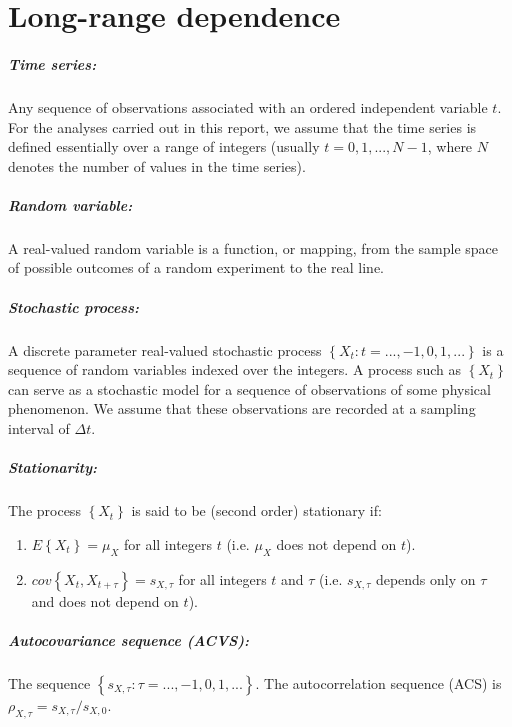 \documentclass[methods.tex]{subfiles}
\begin{document}
\chapter{Long-range dependence}

\paragraph{Time series:} Any sequence of observations associated with an ordered independent variable $t$. For the analyses carried out in this report, we assume that the time series is defined essentially over a range of integers (usually $t = 0 , 1 , ... , N - 1$, where $N$ denotes the number of values in the time series).

\paragraph{Random variable:} A real-valued random variable is a function, or mapping, from the sample space of possible outcomes of a random experiment to the real line.

\paragraph{Stochastic process:} A discrete parameter real-valued stochastic process $\left\{ X_t : t = ... , -1 , 0 , 1 , ... \right\}$ is a sequence of random variables indexed over the integers. A process such as $\left\{ X_t \right\}$ can serve as a stochastic model for a sequence of observations of some physical phenomenon. We assume that these observations are recorded at a sampling interval of $\Delta t$.

\paragraph{Stationarity:} The process $\left\{ X_t \right\} $ is said to be (second order) stationary if:
\begin{enumerate}
\item $E \left\{ X_t \right\} = \mu_X$ for all integers $t$ (i.e. $\mu_X$ does not depend on $t$).
\item $cov \left\{ X_t , X_{t + \tau} \right\} = s_{X , \tau}$ for all integers $t$ and $\tau$ (i.e. $s_{X , \tau}$ depends only on $\tau$ and does not depend on $t$).
\end{enumerate}

\paragraph{Autocovariance sequence (ACVS):} The sequence $\left\{ s_{X , \tau} : \tau = ... , -1 , 0 , 1 , ... \right\}$. The autocorrelation sequence (ACS) is $\rho_{X , \tau} = s_{X , \tau } / s_{X , 0}$.
\end{document}
